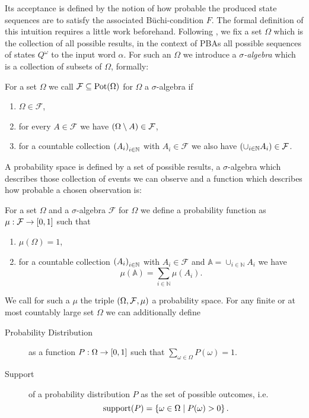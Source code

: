 Its acceptance is defined by the notion of how probable the produced state
sequences are to satisfy the associated Büchi-condition $F$. The formal
definition of this intuition requires a little work beforehand.
Following \cite{Groesser,Bauer}, we fix a set $\Omega$ which is the collection
of all possible results, in the context of \acp{PBA} all possible sequences of
states $Q^{\omega}$ to the input word $\alpha$.
For such an $\Omega$ we introduce a \emph{$\sigma$-algebra} which is a
collection of subsets of $\Omega$, formally:
\begin{definition}
  For a set $\Omega$ we call $\mathcal{F}\subseteq\operatorname{Pot}(\Omega)$ for $\Omega$ a
  $\sigma$-algebra if
  \begin{enumerate}
    \item $\Omega\in\mathcal{F}$,
    \item for every $A\in\mathcal{F}$ we have $\left(\Omega\setminus A\right)
      \in\mathcal{F}$,
    \item for a countable collection $\left(A_{i}\right)_{i\in\mathbb{N}}$ with
      $A_{i}\in\mathcal{F}$ we also have $\left(\cup_{i\in\mathbb{N}}A_{i}\right)\in
      \mathcal{F}$.
  \end{enumerate}
\end{definition}
A probability space is defined by a set of possible results, a $\sigma$-algebra
which describes those collection of events we can observe and a function which
describes how probable a chosen observation is:
\begin{definition}
  For a set $\Omega$ and a $\sigma$-algebra $\mathcal{F}$ for $\Omega$ we
  define a probability function as $\mu:\mathcal{F}\rightarrow\left[0,1\right]$
  such that
  \begin{enumerate}
    \item $\mu(\Omega) = 1$,
    \item for a countable collection $\left(A_{i}\right)_{i\in\mathbb{N}}$ with
      $A_{i}\in\mathcal{F}$ and $\mathbb{A} = \cup_{i\in\mathbb{N}}A_{i}$ we
      have
      \begin{equation*}
        \mu(\mathbb{A}) = \sum_{i\in\mathbb{N}}\mu(A_{i}).
      \end{equation*}
  \end{enumerate}
  We call for such a $\mu$ the triple $\left(\Omega,\mathcal{F},\mu\right)$ a 
  probability space. For any finite or at most countably large set $\Omega$ we 
  can additionally define
  \begin{description}
    \item [Probability Distribution] as a function
      $P:\Omega\rightarrow\left[0,1\right]$ such that
      $\sum_{\omega\in\Omega}P(\omega) = 1$.
    \item [Support] of a probability distribution $P$ as the set of possible
      outcomes, i.e.
      \begin{equation*}
        \operatorname{support}(P) = \left\{\omega\in\Omega\mid P(\omega) > 0\right\}.
      \end{equation*}
  \end{description}
\end{definition}
